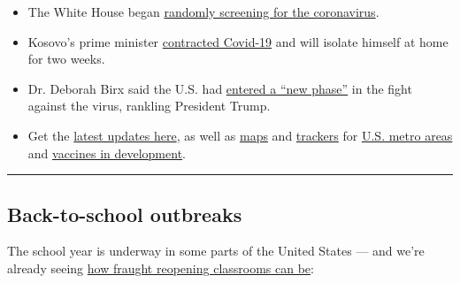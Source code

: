 \begin{itemize}
\item
  The White House began
  \href{https://www.nytimes.com/2020/08/03/world/coronavirus-covid-19.html\#link-c4a1d71}{randomly
  screening for the coronavirus}.
\item
  Kosovo's prime minister
  \href{https://www.reuters.com/article/us-health-coronavirus-kosovo-primeminist/kosovo-prime-minister-says-he-has-covid-19-idUSKBN24Y0ON}{contracted
  Covid-19} and will isolate himself at home for two weeks.
\item
  Dr. Deborah Birx said the U.S. had
  \href{https://www.nytimes.com/2020/08/03/world/coronavirus-covid-19.html\#link-75107159}{entered
  a ``new phase''} in the fight against the virus, rankling President
  Trump.
\item
  Get the \href{https://www.nytimes.com/news-event/coronavirus}{latest
  updates here}, as well as
  \href{https://www.nytimes.com/interactive/2020/world/asia/china-wuhan-coronavirus-maps.html?action=click\&pgtype=Article\&state=default\&module=styln-coronavirus\&variant=show\&region=TOP_BANNER\&context=storyline_menu}{maps}
  and
  \href{https://www.nytimes.com/interactive/2020/04/03/upshot/coronavirus-metro-area-tracker.html}{trackers}
  for
  \href{https://www.nytimes.com/interactive/2020/04/03/upshot/coronavirus-metro-area-tracker.html}{U.S.
  metro areas} and
  \href{https://www.nytimes.com/interactive/2020/science/coronavirus-vaccine-tracker.html}{vaccines
  in development}.
\end{itemize}

\begin{center}\rule{0.5\linewidth}{\linethickness}\end{center}

\hypertarget{back-to-school-outbreaks}{%
\subsection{Back-to-school outbreaks}\label{back-to-school-outbreaks}}

The school year is underway in some parts of the United States --- and
we're already seeing
\href{https://www.nytimes.com/2020/08/03/world/coronavirus-covid-19.html?action=click\&module=Top\%20Stories\&pgtype=Homepage\#link-4c85ed64}{how
fraught reopening classrooms can be}:

